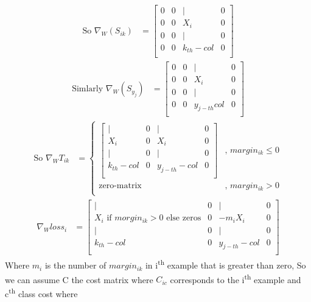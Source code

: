 \documentclass[]{article}
\begin{document}
\begin{align}
	\text{So } \nabla_W \left( S_{ik} \right) &= \left[\begin{array}{cccc}
	0 & 0 & | & 0 \\
	0 & 0 & X_i & 0 \\
	0 & 0 & | & 0 \\
	0 & 0 & k_{th}-col & 0 \\
	\end{array}\right]
\end{align}
\begin{align}
	\text{Simlarly } \nabla_W \left( S_{y_j} \right) &= \left[\begin{array}{cccc}
	0 & 0 & | & 0 \\
	0 & 0 & X_i & 0 \\
	0 & 0 & | & 0 \\
	0 & 0 & y_{j-th} col & 0 \\
	\end{array}\right]
\end{align}
\begin{align}
	\text{So } \nabla_W T_{ik} &= \begin{cases}
	\left[\begin{array}{cccc}
	| & 0 & | & 0 \\
	X_i & 0 & X_i & 0 \\
	| & 0 & | & 0 \\
	k_{th}-col & 0 & y_{j-th}-col & 0 \\
	\end{array}\right] & \text{, } margin_{ik} \le 0 \\
	\text{zero-matrix} & \text{, } margin_{ik} > 0 \\
	\end{cases}
\end{align}
\begin{align}
	\nabla_W loss_{i} &= \left[\begin{array}{cccc}
	| & 0 & | & 0 \\
	\text{$X_i$ if $morgin_{ik} > 0$  else zeros} & 0 & -m_i X_i & 0 \\
	| & 0 & | & 0 \\
	k_{th}-col & 0 & y_{j-th}-col & 0 \\
	\end{array}\right]
\end{align}
Where $m_i$ is the number of $margin_{ik}$ in i\textsuperscript{th} example that is greater than zero, \newline So we can assume C the cost matrix where $C_{ic}$ corresponds to the i\textsuperscript{th} example and c\textsuperscript{th} class cost where
\end{document}
